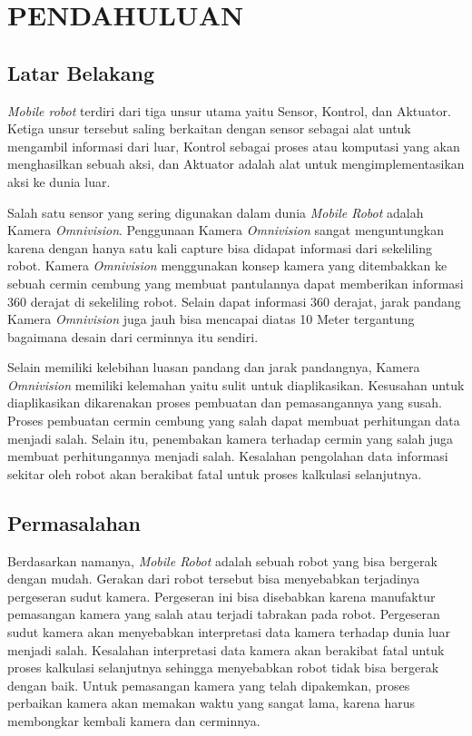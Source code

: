 \chapter{PENDAHULUAN}
\label{chap:pendahuluan}


\section{Latar Belakang}
\label{sec:latarbelakang}


\emph{Mobile robot} terdiri dari tiga unsur utama yaitu Sensor, Kontrol, dan Aktuator. Ketiga unsur tersebut saling berkaitan dengan sensor sebagai alat untuk mengambil informasi dari luar, Kontrol sebagai proses atau komputasi yang akan menghasilkan sebuah aksi, dan Aktuator adalah alat untuk mengimplementasikan aksi ke dunia luar. 

Salah satu sensor yang sering digunakan dalam dunia \emph{Mobile Robot} adalah Kamera \emph{Omnivision}. Penggunaan Kamera \emph{Omnivision} sangat menguntungkan karena dengan hanya satu kali capture bisa didapat informasi dari sekeliling robot. Kamera \emph{Omnivision} menggunakan konsep kamera yang ditembakkan ke sebuah cermin cembung yang membuat pantulannya dapat memberikan informasi 360 derajat di sekeliling robot. Selain dapat informasi 360 derajat, jarak pandang Kamera \emph{Omnivision} juga jauh bisa mencapai diatas 10 Meter tergantung bagaimana desain dari cerminnya itu sendiri. 

Selain memiliki kelebihan luasan pandang dan jarak pandangnya, Kamera \emph{Omnivision} memiliki kelemahan yaitu sulit untuk diaplikasikan. Kesusahan untuk diaplikasikan dikarenakan proses pembuatan dan pemasangannya yang susah. Proses pembuatan cermin cembung yang salah dapat membuat perhitungan data menjadi salah. Selain itu, penembakan kamera terhadap cermin yang salah juga membuat perhitungannya menjadi salah. Kesalahan pengolahan data informasi sekitar oleh robot akan berakibat fatal untuk proses kalkulasi selanjutnya. 


\section{Permasalahan}
\label{sec:permasalahan}

Berdasarkan namanya, \emph{Mobile Robot} adalah sebuah robot yang bisa bergerak dengan mudah. Gerakan dari robot tersebut bisa menyebabkan terjadinya pergeseran sudut kamera. Pergeseran ini bisa disebabkan karena manufaktur pemasangan kamera yang salah atau terjadi tabrakan pada robot. Pergeseran sudut kamera akan menyebabkan interpretasi data kamera terhadap dunia luar menjadi salah. Kesalahan interpretasi data kamera akan berakibat fatal untuk proses kalkulasi selanjutnya sehingga menyebabkan robot tidak bisa bergerak dengan baik. Untuk pemasangan kamera yang telah dipakemkan, proses perbaikan kamera akan memakan waktu yang sangat lama, karena harus membongkar kembali kamera dan cerminnya. 


